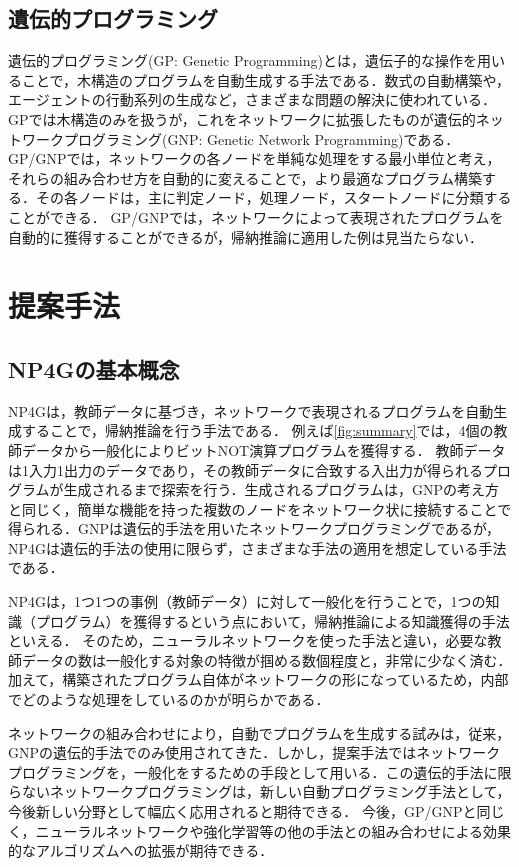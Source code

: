 \documentclass[exploratorypaper]{jsaiart} %
\begin{document}
\subsection{遺伝的プログラミング}
遺伝的プログラミング(GP: Genetic Programming)とは，遺伝子的な操作を用いることで，木構造のプログラムを自動生成する手法である\cite{Koza1994}．数式の自動構築や，エージェントの行動系列の生成など，さまざまな問題の解決に使われている．GPでは木構造のみを扱うが，これをネットワークに拡張したものが遺伝的ネットワークプログラミング(GNP: Genetic Network Programming)である\cite{gnp}．
GP/GNPでは，ネットワークの各ノードを単純な処理をする最小単位と考え，それらの組み合わせ方を自動的に変えることで，より最適なプログラム構築する．その各ノードは，主に判定ノード，処理ノード，スタートノードに分類することができる．
GP/GNPでは，ネットワークによって表現されたプログラムを自動的に獲得することができるが，帰納推論に適用した例は見当たらない．

\section{提案手法}
\subsection{NP4Gの基本概念}
NP4Gは，教師データに基づき，ネットワークで表現されるプログラムを自動生成することで，帰納推論を行う手法である．
例えば\ref{fig:summary}では，4個の教師データから一般化によりビットNOT演算プログラムを獲得する．
教師データは1入力1出力のデータであり，その教師データに合致する入出力が得られるプログラムが生成されるまで探索を行う．生成されるプログラムは，GNPの考え方と同じく，簡単な機能を持った複数のノードをネットワーク状に接続することで得られる．GNPは遺伝的手法を用いたネットワークプログラミングであるが，NP4Gは遺伝的手法の使用に限らず，さまざまな手法の適用を想定している手法である．

NP4Gは，1つ1つの事例（教師データ）に対して一般化を行うことで，1つの知識（プログラム）を獲得するという点において，帰納推論による知識獲得の手法といえる．
そのため，ニューラルネットワークを使った手法と違い，必要な教師データの数は一般化する対象の特徴が掴める数個程度と，非常に少なく済む．加えて，構築されたプログラム自体がネットワークの形になっているため，内部でどのような処理をしているのかが明らかである．

ネットワークの組み合わせにより，自動でプログラムを生成する試みは，従来，GNPの遺伝的手法でのみ使用されてきた．しかし，提案手法ではネットワークプログラミングを，一般化をするための手段として用いる．この遺伝的手法に限らないネットワークプログラミングは，新しい自動プログラミング手法として，今後新しい分野として幅広く応用されると期待できる．
今後，GP/GNPと同じく，ニューラルネットワークや強化学習等の他の手法との組み合わせによる効果的なアルゴリズムへの拡張が期待できる．
\end{document}
